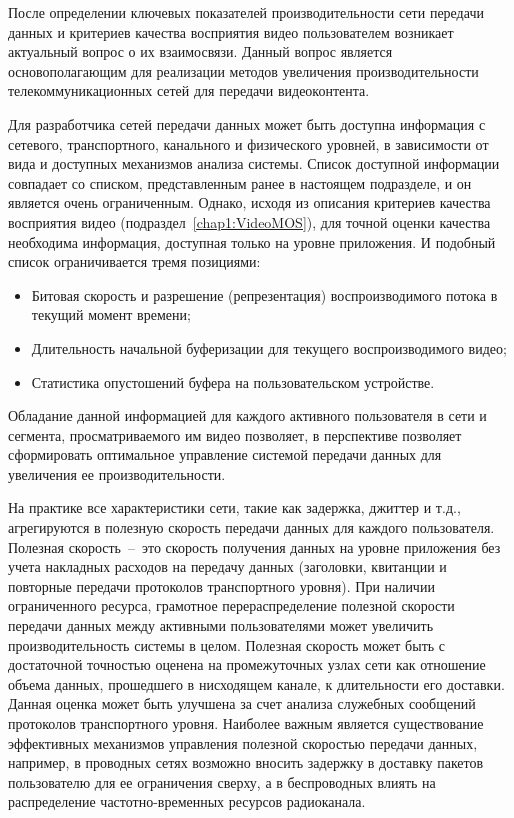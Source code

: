 После определении ключевых показателей производительности сети передачи данных и критериев качества восприятия видео пользователем возникает актуальный вопрос о их взаимосвязи. Данный вопрос является основополагающим для реализации методов увеличения производительности телекоммуникационных сетей для передачи видеоконтента.

Для разработчика сетей передачи данных может быть доступна информация с сетевого, транспортного, канального и физического уровней, в зависимости от вида и доступных механизмов анализа системы. Список доступной информации совпадает со списком, представленным ранее в настоящем подразделе, и он является очень ограниченным. Однако, исходя из описания критериев качества восприятия видео (подраздел~\ref{chap1:VideoMOS}), для точной оценки качества необходима информация, доступная только на уровне приложения. И подобный список ограничивается тремя позициями:
\begin{itemize}
  \item Битовая скорость и разрешение (репрезентация) воспроизводимого потока в текущий момент времени;
  \item Длительность начальной буферизации для текущего воспроизводимого видео;
  \item Статистика опустошений буфера на пользовательском устройстве.
\end{itemize}
Обладание данной информацией для каждого активного пользователя в сети и сегмента, просматриваемого им видео позволяет, в перспективе позволяет сформировать оптимальное управление системой передачи данных для увеличения ее производительности.

На практике все характеристики сети, такие как задержка, джиттер и т.д., агрегируются в полезную скорость передачи данных для каждого пользователя. Полезная скорость~--~это скорость получения данных на уровне приложения без учета накладных расходов на передачу данных (заголовки, квитанции и повторные передачи протоколов транспортного уровня). При наличии ограниченного ресурса, грамотное перераспределение полезной скорости передачи данных между активными пользователями может увеличить производительность системы в целом. Полезная скорость может быть с достаточной точностью оценена на промежуточных узлах сети как отношение объема данных, прошедшего в нисходящем канале, к длительности его доставки. Данная оценка может быть улучшена за счет анализа служебных сообщений протоколов транспортного уровня. Наиболее важным является существование эффективных механизмов управления полезной скоростью передачи данных, например, в проводных сетях возможно вносить задержку в доставку пакетов пользователю для ее ограничения сверху, а в беспроводных влиять на распределение частотно-временных ресурсов радиоканала.

